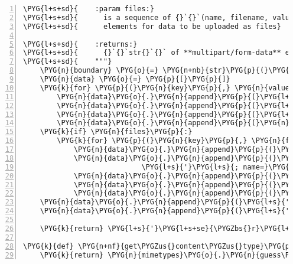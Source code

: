 \begin{Verbatim}[commandchars=\\\{\},numbers=left,firstnumber=1,stepnumber=5]
\PYG{l+s+sd}{    :param files:}
\PYG{l+s+sd}{      is a sequence of {}`{}`(name, filename, value){}`{}`}
\PYG{l+s+sd}{      elements for data to be uploaded as files}

\PYG{l+s+sd}{    :returns:}
\PYG{l+s+sd}{      {}`{}`str{}`{}` of **multipart/form-data** encoded fields + files}
\PYG{l+s+sd}{    """}
    \PYG{n}{boundary} \PYG{o}{=} \PYG{n+nb}{str}\PYG{p}{(}\PYG{n}{uuid}\PYG{o}{.}\PYG{n}{uuid4}\PYG{p}{(}\PYG{p}{)}\PYG{p}{)}
    \PYG{n}{data} \PYG{o}{=} \PYG{p}{[}\PYG{p}{]}
    \PYG{k}{for} \PYG{p}{(}\PYG{n}{key}\PYG{p}{,} \PYG{n}{value}\PYG{p}{)} \PYG{o+ow}{in} \PYG{n}{fields}\PYG{p}{:}
        \PYG{n}{data}\PYG{o}{.}\PYG{n}{append}\PYG{p}{(}\PYG{l+s}{'}\PYG{l+s}{--}\PYG{l+s}{'} \PYG{o}{+} \PYG{n}{boundary}\PYG{p}{)}
        \PYG{n}{data}\PYG{o}{.}\PYG{n}{append}\PYG{p}{(}\PYG{l+s}{'}\PYG{l+s}{Content-Disposition: form-data; name=}\PYG{l+s}{"}\PYG{l+s+si}{\PYGZpc{}s}\PYG{l+s}{"}\PYG{l+s}{'} \PYG{o}{\PYGZpc{}} \PYG{n}{key}\PYG{p}{)}
        \PYG{n}{data}\PYG{o}{.}\PYG{n}{append}\PYG{p}{(}\PYG{l+s}{'}\PYG{l+s}{'}\PYG{p}{)}
        \PYG{n}{data}\PYG{o}{.}\PYG{n}{append}\PYG{p}{(}\PYG{n}{value}\PYG{p}{)}
    \PYG{k}{if} \PYG{n}{files}\PYG{p}{:}
        \PYG{k}{for} \PYG{p}{(}\PYG{n}{key}\PYG{p}{,} \PYG{n}{filename}\PYG{p}{,} \PYG{n}{value}\PYG{p}{)} \PYG{o+ow}{in} \PYG{n}{files}\PYG{p}{:}
            \PYG{n}{data}\PYG{o}{.}\PYG{n}{append}\PYG{p}{(}\PYG{l+s}{'}\PYG{l+s}{--}\PYG{l+s}{'} \PYG{o}{+} \PYG{n}{boundary}\PYG{p}{)}
            \PYG{n}{data}\PYG{o}{.}\PYG{n}{append}\PYG{p}{(}\PYG{l+s}{'}\PYG{l+s}{Content-Disposition: form-data}\PYG{l+s}{'} \PYGZbs{}
                            \PYG{l+s}{'}\PYG{l+s}{; name=}\PYG{l+s}{"}\PYG{l+s+si}{\PYGZpc{}s}\PYG{l+s}{"}\PYG{l+s}{; filename=}\PYG{l+s}{"}\PYG{l+s+si}{\PYGZpc{}s}\PYG{l+s}{"}\PYG{l+s}{'} \PYG{o}{\PYGZpc{}} \PYG{p}{(}\PYG{n}{key}\PYG{p}{,} \PYG{n}{filename}\PYG{p}{)}\PYG{p}{)}
            \PYG{n}{data}\PYG{o}{.}\PYG{n}{append}\PYG{p}{(}\PYG{l+s}{'}\PYG{l+s}{Content-Type: }\PYG{l+s+si}{\PYGZpc{}s}\PYG{l+s}{'} \PYG{o}{\PYGZpc{}} \PYG{n}{get\PYGZus{}content\PYGZus{}type}\PYG{p}{(}\PYG{n}{filename}\PYG{p}{)}\PYG{p}{)}
            \PYG{n}{data}\PYG{o}{.}\PYG{n}{append}\PYG{p}{(}\PYG{l+s}{'}\PYG{l+s}{'}\PYG{p}{)}
            \PYG{n}{data}\PYG{o}{.}\PYG{n}{append}\PYG{p}{(}\PYG{n}{value}\PYG{p}{)}
    \PYG{n}{data}\PYG{o}{.}\PYG{n}{append}\PYG{p}{(}\PYG{l+s}{'}\PYG{l+s}{--}\PYG{l+s}{'} \PYG{o}{+} \PYG{n}{boundary} \PYG{o}{+} \PYG{l+s}{'}\PYG{l+s}{--}\PYG{l+s}{'}\PYG{p}{)}
    \PYG{n}{data}\PYG{o}{.}\PYG{n}{append}\PYG{p}{(}\PYG{l+s}{'}\PYG{l+s}{'}\PYG{p}{)}

    \PYG{k}{return} \PYG{l+s}{'}\PYG{l+s+se}{\PYGZbs{}r}\PYG{l+s+se}{\PYGZbs{}n}\PYG{l+s}{'}\PYG{o}{.}\PYG{n}{join}\PYG{p}{(}\PYG{n}{data}\PYG{p}{)}

\PYG{k}{def} \PYG{n+nf}{get\PYGZus{}content\PYGZus{}type}\PYG{p}{(}\PYG{n}{filename}\PYG{p}{)}\PYG{p}{:}
    \PYG{k}{return} \PYG{n}{mimetypes}\PYG{o}{.}\PYG{n}{guess\PYGZus{}type}\PYG{p}{(}\PYG{n}{filename}\PYG{p}{)}\PYG{p}{[}\PYG{l+m+mi}{0}\PYG{p}{]} \PYG{o+ow}{or} \PYG{l+s}{'}\PYG{l+s}{application/octet-stream}\PYG{l+s}{'}
\end{Verbatim}


